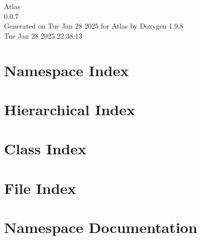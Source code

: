 \documentclass[twoside]{book}
\newcommand{\+}{\discretionary{\mbox{\scriptsize$\hookleftarrow$}}{}{}}
\newcommand{\clearemptydoublepage}{%
    \newpage{\pagestyle{empty}\cleardoublepage}%
  }
\begin{document}
  \raggedbottom
    \hypersetup{pageanchor=false,
                bookmarksnumbered=true,
                pdfencoding=unicode
               }
  \begin{titlepage}
  \vspace*{7cm}
  \begin{center}%
  {\Large Atlas}\\
  [1ex]\large 0.\+0.\+7 \\
  \vspace*{1cm}
  {\large Generated on Tue Jan 28 2025 for Atlas by Doxygen 1.9.8}\\
    \vspace*{0.5cm}
    {\small Tue Jan 28 2025 22:38:13}
  \end{center}
  \end{titlepage}
  \clearemptydoublepage
  \tableofcontents
  \clearemptydoublepage
  \hypersetup{pageanchor=true}




\chapter{Namespace Index}

\chapter{Hierarchical Index}

\chapter{Class Index}

\chapter{File Index}

\chapter{Namespace Documentation}














\end{document}
